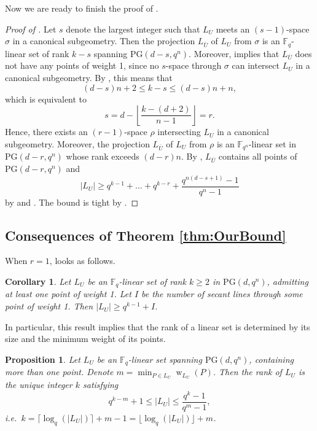 \documentclass[11pt]{article}
\newtheorem{corollary}[theorem]{Corollary}
\newtheorem{proposition}[theorem]{Proposition}
\theoremstyle{definition}
\newcommand{\fqn}{\mathbb{F}_{q^n}}
\newcommand{\F}{{\mathbb F}}
\newcommand{\fq}{{\mathbb F}_{q}}
\newcommand{\PG}{\mathrm{PG}}
\newcommand{\pg}{\PG}
\DeclareMathOperator{\ww}{w}
\newcommand{\floor}[1]{\left \lfloor #1 \right \rfloor}
\begin{document}
Now we are ready to finish the proof of .

\begin{proof}[Proof of ]
 Let $s$ denote the largest integer such that $L_U$ meets an $(s-1)$-space $\sigma$ in a canonical subgeometry. 
 Then the projection $L_{\overline U}$ of $L_U$ from $\sigma$ is an $\fq$-linear set of rank $k-s$ spanning $\pg(d-s,q^n)$.
 Moreover,  implies that $L_{\overline U}$ does not have any points of weight 1, since no $s$-space through $\sigma$ can intersect $L_U$ in a canonical subgeometry.
 By , this means that
 \[
  (d-s)n + 2 \leq k-s \leq (d-s)n + n,
 \]
 which is equivalent to
 \[
  s = d - \floor{\frac{k-(d+2)}{n-1}} = r.
 \]
 Hence, there exists an $(r-1)$-space $\rho$ intersecting $L_U$ in a canonical subgeometry.
 Moreover, the projection $L_{\overline U}$ of $L_U$ from $\rho$ is an $\fqn$-linear set in $\pg(d-r,q^n)$ whose rank exceeds $(d-r)n$.
 By , $L_{\overline U}$ contains all points of $\pg(d-r,q^n)$ and
 \[
  |L_U| \geq q^{k-1} + \ldots + q^{k-r} + \frac{q^{n(d-s+1)}-1}{q^n-1}
 \]
 by  and .
 The bound is tight by .
\end{proof}







\subsection{Consequences of Theorem \texorpdfstring{\ref{thm:OurBound}}{1.4} }

When $r=1$,  looks as follows.

\begin{corollary} \label{cor:pointweightonesize}
Let $L_U$ be an $\F_q$-linear set of rank $k \geq 2$ in $\PG(d,q^n)$, admitting at least one point of weight 1. Let $I$ be the number of secant lines through some point of weight 1. Then $\lvert L_U \rvert \geq q^{k-1}+I$.
\end{corollary}

In particular, this result implies that the rank of a linear set is determined by its size and the minimum weight of its points.

\begin{proposition}
 Let $L_U$ be an $\fq$-linear set spanning $\PG(d,q^n)$, containing more than one point.
 Denote $m = \min_{P \in L_U} \ww_{L_U}(P)$.
 Then the rank of $L_U$ is the unique integer $k$ satisfying
 \[
  q^{k-m} + 1 \leq |L_U| \leq \frac{q^k-1}{q^m-1},
 \]
 i.e.\ $k = \lceil \log_q(|L_U|) \rceil + m - 1 = \lfloor \log_q(|L_U|) \rfloor + m$.
\end{proposition}
\end{document}
